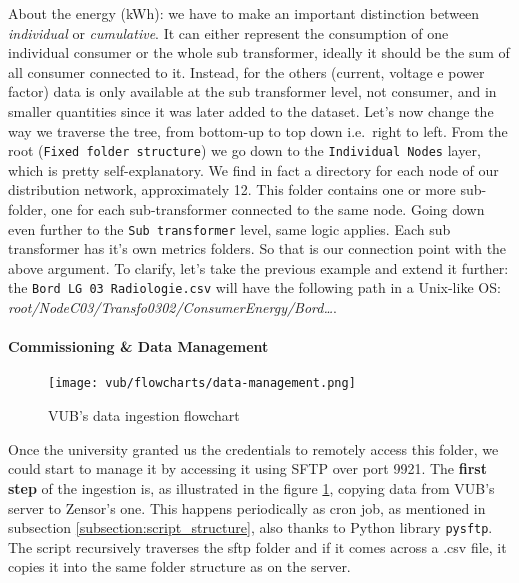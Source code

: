 About the energy (kWh): we have to make an important distinction between \textit{individual} or \textit{cumulative}. It can either represent the consumption of one individual consumer or the whole sub transformer, 
ideally it should be the sum of all consumer connected to it.
Instead, for the others (current, voltage e power factor) data is only available at the sub transformer level, not consumer, and in smaller quantities since it was later added to the dataset. 
Let's now change the way we traverse the tree, from bottom-up to top down i.e.\ right to left.
From the root (\texttt{Fixed folder structure}) we go down to the \texttt{Individual Nodes} layer, which is pretty self-explanatory. We find in fact a directory for each node of our distribution network, approximately 12. 
This folder contains one or more sub-folder, one for each sub-transformer connected to the same node. Going down even further to the \texttt{Sub transformer} level, same logic applies. Each sub transformer has it's own metrics folders.
So that is our connection point with the above argument.
To clarify, let's take the previous example and extend it further: the \texttt{Bord LG 03 Radiologie.csv} will have the following path in a Unix-like OS: \textit{root/NodeC03/Transfo0302/ConsumerEnergy/Bord\dots}.

\paragraph{Commissioning \& Data Management}
\begin{figure}[ht]
    \texttt{[image: vub/flowcharts/data-management.png]}
    \caption{\ac{VUB}'s data ingestion flowchart}
    \label{fig:vub_ingestion}
\end{figure}
Once the university granted us the credentials to remotely access this folder, we could start to manage it by accessing it using \ac{SFTP} over port 9921. %
The \textbf{first step} of the ingestion is, as illustrated in the figure \ref{fig:vub_ingestion}, copying data from \ac{VUB}'s server to Zensor's one. 
This happens periodically as cron job, as mentioned in subsection \ref{subsection:script_structure}, also thanks to Python library \texttt{pysftp}. %
The script recursively traverses the sftp folder and if it comes across a .csv file, it copies it into the same folder structure as on the server.

